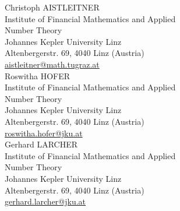 \documentclass[10pt]{article}
\begin{document}
Christoph AISTLEITNER\\
Institute of Financial Mathematics and Applied\\
Number Theory\\
Johannes Kepler University Linz\\
Altenbergerstr. 69, 4040 Linz (Austria)\\
\href{mailto:aistleitner@math.tugraz.at}{aistleitner@math.tugraz.at}\\
Roswitha HOFER\\
Institute of Financial Mathematics and Applied\\
Number Theory\\
Johannes Kepler University Linz\\
Altenbergerstr. 69, 4040 Linz (Austria)\\
\href{mailto:roswitha.hofer@jku.at}{roswitha.hofer@jku.at}\\
Gerhard LARCHER\\
Institute of Financial Mathematics and Applied\\
Number Theory\\
Johannes Kepler University Linz\\
Altenbergerstr. 69, 4040 Linz (Austria)\\
\href{mailto:gerhard.larcher@jku.at}{gerhard.larcher@jku.at}
\end{document}
